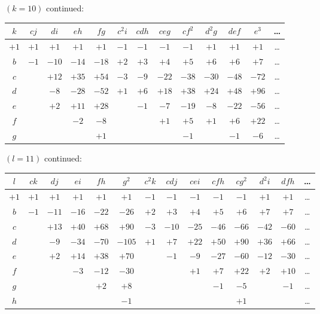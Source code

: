 \documentclass[11pt,a4paper]{book}
\begin{document}
\medskip

\noindent $(k = 10)$ continued:
\begin{center}
\small
\begin{tabular}{|c|c|c|c|c|c|c|c|c|c|c|c|c|}
\hline
$k$ & $cj$ & $di$ & $eh$ & $fg$ & $c^2i$ & $cdh$ & $ceg$ & $cf^2$ & $d^2g$ & $def$ & $e^3$ & \dots \\
\hline
$+1$ & $+1$ & $+1$ & $+1$ & $+1$ & $-1$ & $-1$ & $-1$ & $-1$ & $+1$ & $+1$ & $+1$ & \dots \\
$b$ & $-1$ & $-10$ & $-14$ & $-18$ & $+2$ & $+3$ & $+4$ & $+5$ & $+6$ & $+6$ & $+7$ & \dots \\
$c$ & & $+12$ & $+35$ & $+54$ & $-3$ & $-9$ & $-22$ & $-38$ & $-30$ & $-48$ & $-72$ & \dots \\
$d$ & & $-8$ & $-28$ & $-52$ & $+1$ & $+6$ & $+18$ & $+38$ & $+24$ & $+48$ & $+96$ & \dots \\
$e$ & & $+2$ & $+11$ & $+28$ & & $-1$ & $-7$ & $-19$ & $-8$ & $-22$ & $-56$ & \dots \\
$f$ & & & $-2$ & $-8$ & & & $+1$ & $+5$ & $+1$ & $+6$ & $+22$ & \dots \\
$g$ & & & & $+1$ & & & & $-1$ & & $-1$ & $-6$ & \dots \\
\hline
\end{tabular}
\end{center}

\medskip

\noindent $(l = 11)$ continued:
\begin{center}
\small
\begin{tabular}{|c|c|c|c|c|c|c|c|c|c|c|c|c|c|}
\hline
$l$ & $ck$ & $dj$ & $ei$ & $fh$ & $g^2$ & $c^2k$ & $cdj$ & $cei$ & $cfh$ & $cg^2$ & $d^2i$ & $dfh$ & \dots \\
\hline
$+1$ & $+1$ & $+1$ & $+1$ & $+1$ & $+1$ & $-1$ & $-1$ & $-1$ & $-1$ & $-1$ & $+1$ & $+1$ & \dots \\
$b$ & $-1$ & $-11$ & $-16$ & $-22$ & $-26$ & $+2$ & $+3$ & $+4$ & $+5$ & $+6$ & $+7$ & $+7$ & \dots \\
$c$ & & $+13$ & $+40$ & $+68$ & $+90$ & $-3$ & $-10$ & $-25$ & $-46$ & $-66$ & $-42$ & $-60$ & \dots \\
$d$ & & $-9$ & $-34$ & $-70$ & $-105$ & $+1$ & $+7$ & $+22$ & $+50$ & $+90$ & $+36$ & $+66$ & \dots \\
$e$ & & $+2$ & $+14$ & $+38$ & $+70$ & & $-1$ & $-9$ & $-27$ & $-60$ & $-12$ & $-30$ & \dots \\
$f$ & & & $-3$ & $-12$ & $-30$ & & & $+1$ & $+7$ & $+22$ & $+2$ & $+10$ & \dots \\
$g$ & & & & $+2$ & $+8$ & & & & $-1$ & $-5$ & & $-1$ & \dots \\
$h$ & & & & & $-1$ & & & & & $+1$ & & & \dots \\
\hline
\end{tabular}
\end{center}
\end{document}

